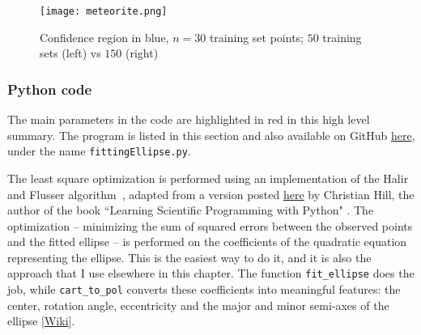 \documentclass[oneside,10pt]{book}
\begin{document}
\begin{figure}[H]
\centering
\texttt{[image: meteorite.png]}
\caption{Confidence region in blue, $n=30$ training set points; $50$ training sets (left) vs $150$ (right)}
\label{fig:meteor}
\end{figure}




\subsubsection{Python code}\label{pipybv}

The main parameters in the code are highlighted in red in this high level summary. The program
  is listed in this section and also available on GitHub
\href{https://github.com/VincentGranville/Machine-Learning/blob/main/Source\%20Code/fittingEllipse.py}{here},
 under the name \texttt{fittingEllipse.py}.

The least square optimization is performed using an implementation of  the Halir and Flusser algorithm~\cite{Halir98numericallystable}, adapted from a version posted
 \href{https://scipython.com/blog/direct-linear-least-squares-fitting-of-an-ellipse/}{here} by Christian Hill, the author of the book
``Learning Scientific Programming with Python" \cite{chsp2016}. The optimization -- minimizing the sum of squared errors between the observed points and the fitted ellipse -- is performed on the coefficients of the quadratic equation representing the ellipse.
 This is the easiest way to do it, and it is also the approach that I use elsewhere in this chapter.
 The function \texttt{fit\_ellipse} does the job, while \texttt{cart\_to\_pol} converts these coefficients into meaningful features: the center, rotation angle, eccentricity and the major and minor semi-axes of the ellipse [\href{https://simple.wikipedia.org/wiki/Semi-major_and_semi-minor_axes}{Wiki}]. \vspace{1ex}


\vspace{1ex}
\end{document}

